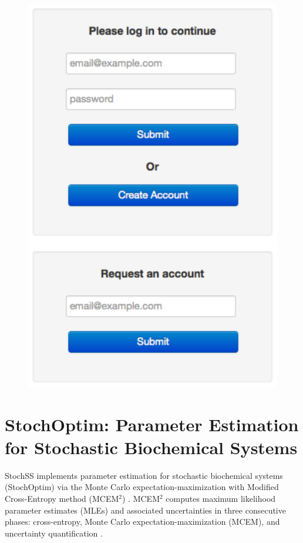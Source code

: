 \documentclass[12pt,notitlepage,nofootinbib]{revtex4}
\begin{document}
\begin{figure}[!htb]
\centering
\includegraphics[scale=0.6]{user-login.pdf}
\end{figure}

\section{StochOptim: Parameter Estimation for Stochastic Biochemical Systems}
StochSS implements parameter estimation for stochastic biochemical systems (StochOptim) via the Monte Carlo expectation-maximization with Modified Cross-Entropy method (MCEM$^2$) \cite{bernie}.
MCEM$^2$ computes maximum likelihood parameter estimates (MLEs) and associated uncertainties in three consecutive phases: cross-entropy, Monte Carlo expectation-maximization (MCEM), and uncertainty quantification \cite{bernie}.
\end{document}
